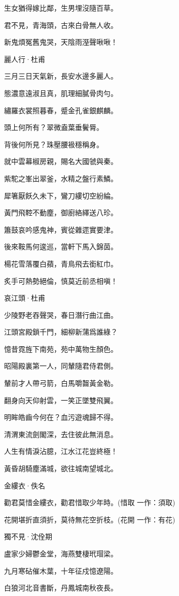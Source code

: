 \documentclass[12pt,a4paper]{ctexbook}
\begin{document}
生女猶得嫁比鄰，生男埋沒隨百草。\par
君不見，青海頭，古來白骨無人收。\par
新鬼煩冤舊鬼哭，天陰雨溼聲啾啾！\par
麗人行·杜甫\par
三月三日天氣新，長安水邊多麗人。\par
態濃意遠淑且真，肌理細膩骨肉勻。\par
繡羅衣裳照暮春，蹙金孔雀銀麒麟。\par
頭上何所有？翠微盍葉垂鬢脣。\par
背後何所見？珠壓腰衱穩稱身。\par
就中雲幕椒房親，賜名大國虢與秦。\par
紫駝之峯出翠釜，水精之盤行素鱗。\par
犀箸厭飫久未下，鸞刀縷切空紛綸。\par
黃門飛鞚不動塵，御廚絡繹送八珍。\par
簫鼓哀吟感鬼神，賓從雜遝實要津。\par
後來鞍馬何逡巡，當軒下馬入錦茵。\par
楊花雪落覆白蘋，青鳥飛去銜紅巾。\par
炙手可熱勢絕倫，慎莫近前丞相嗔！\par
哀江頭·杜甫\par
少陵野老吞聲哭，春日潛行曲江曲。\par
江頭宮殿鎖千門，細柳新蒲爲誰綠？\par
憶昔霓旌下南苑，苑中萬物生顏色。\par
昭陽殿裏第一人，同輦隨君侍君側。\par
輦前才人帶弓箭，白馬嚼齧黃金勒。\par
翻身向天仰射雲，一笑正墜雙飛翼。\par
明眸皓齒今何在？血污遊魂歸不得。\par
清渭東流劍閣深，去住彼此無消息。\par
人生有情淚沾臆，江水江花豈終極！\par
黃昏胡騎塵滿城，欲往城南望城北。\par
金縷衣·佚名\par
勸君莫惜金縷衣，勸君惜取少年時。(惜取 一作：須取)\par
花開堪折直須折，莫待無花空折枝。(花開 一作：有花)\par
獨不見·沈佺期\par
盧家少婦鬱金堂，海燕雙棲玳瑁梁。\par
九月寒砧催木葉，十年征戍憶遼陽。\par
白狼河北音書斷，丹鳳城南秋夜長。\par
\end{document}

